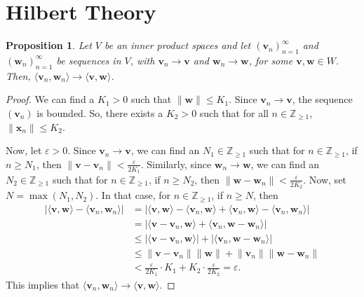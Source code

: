 \documentclass[a4paper, openany]{memoir}
\theoremstyle{definition}
\theoremstyle{plain}
\newtheorem{proposition}[definition]{Proposition}
\begin{document}
    \newpage

    \section{Hilbert Theory}
    \begin{proposition}
        Let $V$ be an inner product spaces and let $(\bm{v}_n)_{n=1}^\infty$ and $(\bm{w}_n)_{n=1}^\infty$ be sequences in $V$, with $\bm{v}_n \to \bm{v}$ and $\bm{w}_n \to \bm{w}$, for some $\bm{v}, \bm{w} \in W$. Then, $\langle \bm{v}_n, \bm{w}_n \rangle \to \langle \bm{v}, \bm{w} \rangle$.
    \end{proposition}
    \begin{proof}
        We can find a $K_1 > 0$ such that $\lVert \bm{w} \rVert \leq K_1$. Since $\bm{v}_n \to \bm{v}$, the sequence $(\bm{v}_n)$ is bounded. So, there exists a $K_2 > 0$ such that for all $n \in \mathbb{Z}_{\geq 1}$, $\lVert \bm{x}_n \rVert \leq K_2$. 
        
        \noindent Now, let $\varepsilon > 0$. Since $\bm{v}_n \to \bm{v}$, we can find an $N_1 \in \mathbb{Z}_{\geq 1}$ such that for $n \in \mathbb{Z}_{\geq 1}$, if $n \geq N_1$, then $\lVert \bm{v} - \bm{v}_n \rVert < \frac{\varepsilon}{2K_1}$. Similarly, since $\bm{w}_n \to \bm{w}$, we can find an $N_2 \in \mathbb{Z}_{\geq 1}$ such that for $n \in \mathbb{Z}_{\geq 1}$, if $n \geq N_2$, then $\lVert \bm{w} - \bm{w}_n \rVert < \frac{\varepsilon}{2K_2}$. Now, set $N = \max(N_1, N_2)$. In that case, for $n \in \mathbb{Z}_{\geq 1}$, if $n \geq N$, then
        \begin{align*}
            |\langle \bm{v}, \bm{w} \rangle - \langle \bm{v}_n, \bm{w}_n \rangle| &= |\langle \bm{v}, \bm{w} \rangle - \langle \bm{v}_n, \bm{w} \rangle + \langle \bm{v}_n, \bm{w} \rangle - \langle \bm{v}_n, \bm{w}_n \rangle| \\
            &= |\langle \bm{v} - \bm{v}_n, \bm{w} \rangle + \langle \bm{v}_n, \bm{w} - \bm{w}_n \rangle| \\
            &\leq |\langle \bm{v} - \bm{v}_n, \bm{w} \rangle| + |\langle \bm{v}_n, \bm{w} - \bm{w}_n \rangle| \\
            &\leq \lVert \bm{v} - \bm{v}_n \rVert \lVert \bm{w} \rVert + \lVert \bm{v}_n \rVert \lVert \bm{w} - \bm{w}_n \rVert \\
            &< \frac{\varepsilon}{2K_1} \cdot K_1 + K_2 \cdot \frac{\varepsilon}{2K_2} = \varepsilon.
        \end{align*}
        This implies that $\langle \bm{v}_n, \bm{w}_n \rangle \to \langle \bm{v}, \bm{w} \rangle$.
    \end{proof}
\end{document}
